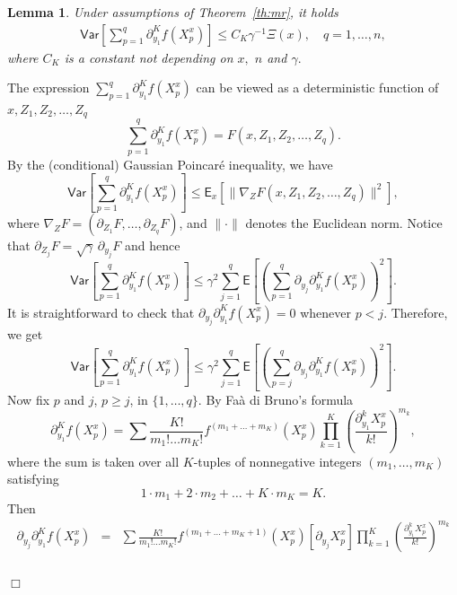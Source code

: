 \documentclass[bj]{imsart}
\newcommand{\proofendsign}{$\Box$}
\newtheorem{lem}[thm]{Lemma}
\newenvironment{proof}{{\noindent \bf Proof }}
 {{\hspace*{\fill}\proofendsign\par\bigskip}}
\begin{document}
\begin{lem}
\label{lem:var_poincare}
Under assumptions of Theorem~\ref{th:mr}, it holds
\begin{eqnarray}
\label{eq:lem-var}
\mathsf{Var}\left[\sum_{p=1}^{q}\partial_{y_{1}}^{K}f\left(X_{p}^x\right)\right]\le  C_K\gamma^{-1}  \Xi(x), \quad q=1,\ldots,n,
\end{eqnarray}
where $C_K$ is a constant not depending on $x,$ $n$ and $\gamma.$
\end{lem}
\begin{proof}
The expression
$\sum_{p=1}^q \partial_{y_1}^K f(X_p^x)$
can be viewed as a deterministic function of
$x,Z_1,Z_{2},\ldots,Z_q$
$$
\sum_{p=1}^q  \partial_{y_1}^K f(X_p^x)
=F(x,Z_1,Z_{2},\ldots,Z_q).
$$
By the (conditional) Gaussian Poincar\'e inequality,
we have
$$
\mathsf{Var}\left[\sum_{p=1}^{q}\partial_{y_{1}}^{K}f\left(X_{p}^x\right)\right]
\le\mathsf E_x\left[
\|\nabla_Z F(x,Z_1,Z_{2},\ldots,Z_q)\|^2
\right],
$$
where $\nabla_Z F=(\partial_{Z_1} F,\ldots,\partial_{Z_q} F)$,
and $\|\cdot\|$ denotes the Euclidean norm.
Notice that \(\partial_{Z_j} F=\sqrt{\gamma}\,\partial_{y_j} F\) and
hence
$$
\mathsf{Var}\left[\sum_{p=1}^{q}\partial_{y_{1}}^{K}f\left(X_{p}^x\right)\right]\leq\gamma^2\sum_{j=1}^{q}\mathsf{E}\left[\left(\sum_{p=1}^{q}\partial_{y_{j}}\partial_{y_{1}}^{K}f\left(X_{p}^x\right)\right)^{2}\right].
$$
It is straightforward to check that
$\partial_{y_j}\partial_{y_1}^K f(X_p^x)=0$
whenever $p<j$. Therefore, we get
\begin{equation}\label{eq:10062018a2}
\mathsf{Var}\left[\sum_{p=1}^{q}\partial_{y_{1}}^{K}f\left(X_{p}^x\right)\right]\leq\gamma^2\sum_{j=1}^{q}\mathsf{E}\left[\left(\sum_{p=j}^{q}\partial_{y_{j}}\partial_{y_{1}}^{K}f\left(X_{p}^x\right)\right)^{2}\right].
\end{equation}
Now fix $p$ and $j$, $p\ge j$, in $\{1,\ldots,q\}$.
By Fa\`a di Bruno's formula
\[
\partial_{y_{1}}^{K}f\left(X_{p}^x\right)=\sum\frac{K!}{m_{1}!\ldots m_{K}!}f^{(m_{1}+\ldots+m_{K})}(X_{p}^x)\prod_{k=1}^{K}\left(\frac{\partial_{y_{1}}^{k}X^x_{p}}{k!}\right)^{m_{k}},
\]
where the sum is taken over all $K$-tuples of nonnegative integers
$(m_1,\ldots,m_K)$ satisfying
$$
1\cdot m_{1}+2\cdot m_{2}+\ldots+K\cdot m_{K}=K.
$$
Then
\begin{eqnarray*}
\partial_{y_{j}}\partial_{y_{1}}^{K}f\left(X_{p}^x\right)
&=&\sum\frac{K!}{m_{1}!\ldots m_{K}!}f^{(m_{1}+\ldots+m_{K}+1)}(X^x_{p})\left[\partial_{y_{j}}X^x_{p}\right]\prod_{k=1}^{K}\left(\frac{\partial_{y_{1}}^{k}X_{p}^x}{k!}\right)^{m_{k}} \\

\end{eqnarray*}
\end{proof}
\end{document}
